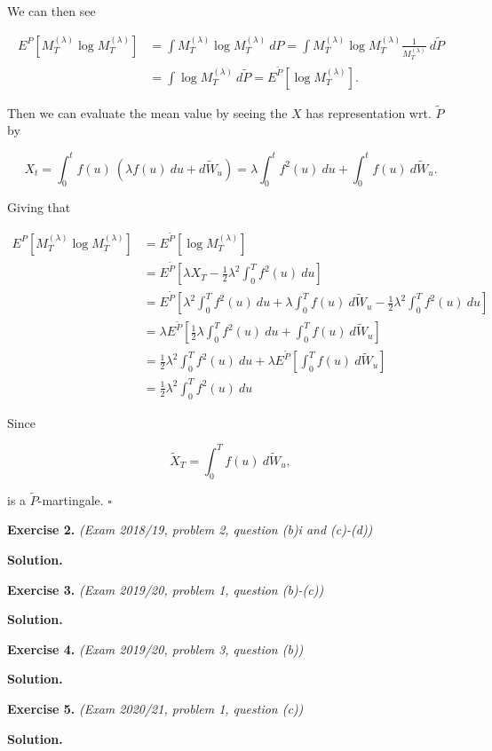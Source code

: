\documentclass[
]{article}
\begin{document}
We can then see

\begin{align*}
E^P[M_T^{(\lambda)}\log M_T^{(\lambda)}]&=\int M_T^{(\lambda)}\log M_T^{(\lambda)}\ dP=\int M_T^{(\lambda)}\log M_T^{(\lambda)} \frac{1}{M_T^{(\lambda)}}\ d\tilde{P}\\
&=\int \log M_T^{(\lambda)}\ d\tilde{P}=E^{\tilde{P}}[\log M_T^{(\lambda)}].
\end{align*}

Then we can evaluate the mean value by seeing the \(X\) has
representation wrt. \(\tilde{P}\) by

\[
X_t=\int_0^tf(u)\ (\lambda f(u)\ du + d\tilde{W}_u)=\lambda\int_0^tf^2(u)\ du+\int_0^tf(u)\ d\tilde{W}_u.
\]

Giving that

\begin{align*}
E^P[M_T^{(\lambda)}\log M_T^{(\lambda)}]&=E^{\tilde{P}}[\log M_T^{(\lambda)}]\\
&=E^{\tilde{P}}\left[ \lambda X_T-\frac{1}{2}\lambda ^2\int_0^T f^2(u)\ du \right]\\
&=E^{\tilde{P}}\left[ \lambda^2\int_0^Tf^2(u)\ du+\lambda\int_0^Tf(u)\ d\tilde{W}_u-\frac{1}{2}\lambda ^2\int_0^T f^2(u)\ du \right]\\
&=\lambda E^{\tilde{P}}\left[\frac{1}{2} \lambda\int_0^Tf^2(u)\ du+\int_0^Tf(u)\ d\tilde{W}_u \right]\\
&=\frac{1}{2} \lambda^2\int_0^Tf^2(u)\ du+\lambda E^{\tilde{P}}\left[\int_0^Tf(u)\ d\tilde{W}_u \right]\\
&=\frac{1}{2} \lambda^2\int_0^Tf^2(u)\ du
\end{align*}

Since

\[
\tilde{X}_T=\int_0^Tf(u)\ d\tilde{W}_u,
\]

is a \(\tilde{P}\)-martingale. \(\square\)

\textbf{Exercise 2.} \emph{(Exam 2018/19, problem 2, question (b)i and
(c)-(d))}

\textbf{Solution.}

\textbf{Exercise 3.} \emph{(Exam 2019/20, problem 1, question (b)-(c))}

\textbf{Solution.}

\textbf{Exercise 4.} \emph{(Exam 2019/20, problem 3, question (b))}

\textbf{Solution.}

\textbf{Exercise 5.} \emph{(Exam 2020/21, problem 1, question (c))}

\textbf{Solution.}
\end{document}
